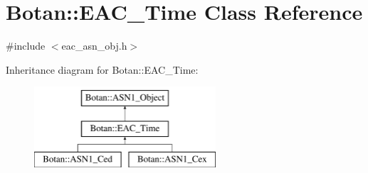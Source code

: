 \hypertarget{classBotan_1_1EAC__Time}{\section{Botan\-:\-:E\-A\-C\-\_\-\-Time Class Reference}
\label{classBotan_1_1EAC__Time}
}


{\ttfamily \#include $<$eac\-\_\-asn\-\_\-obj.\-h$>$}

Inheritance diagram for Botan\-:\-:E\-A\-C\-\_\-\-Time\-:\begin{figure}[H]
\begin{center}
\leavevmode
\includegraphics[height=3.000000cm]{classBotan_1_1EAC__Time}
\end{center}
\end{figure}
